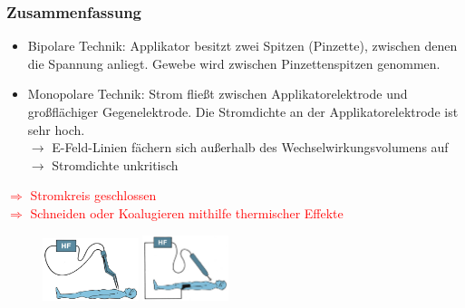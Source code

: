 \documentclass{beamer}
\begin{document}
\begin{frame}
\frametitle{Zusammenfassung}
	\begin{itemize}
		\item Bipolare Technik:	Applikator besitzt zwei Spitzen (Pinzette), zwischen denen die Spannung anliegt. Gewebe wird zwischen Pinzettenspitzen genommen.
		\item Monopolare Technik: Strom fließt zwischen Applikatorelektrode und großflächiger Gegenelektrode. Die Stromdichte an der Applikatorelektrode ist sehr hoch.\\
		$\rightarrow$ E-Feld-Linien fächern sich außerhalb des Wechselwirkungsvolumens auf $\rightarrow$ Stromdichte unkritisch 
	\end{itemize}
\textcolor{red}{$\Rightarrow$ Stromkreis geschlossen}\\
\textcolor{red}{$\Rightarrow$ Schneiden oder Koalugieren mithilfe thermischer Effekte}
	\begin{figure}
	\includegraphics[width=2.8cm]{images/bipolareTechnik.png}
	\hspace{1cm}
	\includegraphics[width=2.5cm]{images/monopolareTechnik.png}
	\end{figure}
\end{frame}
\end{document}
